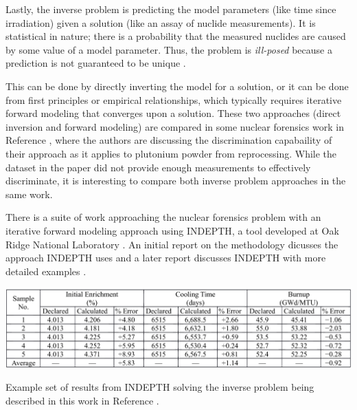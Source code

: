 Lastly, the inverse problem is predicting the model parameters (like time since
irradiation) given a solution (like an assay of nuclide measurements).  It is
statistical in nature; there is a probability that the measured nuclides are
caused by some value of a model parameter. Thus, the problem is
\textit{ill-posed} because a prediction is not guaranteed to be unique
\cite{skutnik_2016}. 

This can be done by directly inverting the model for a solution, or it can be
done from first principles or empirical relationships, which typically requires
iterative forward modeling that converges upon a solution. These two approaches
(direct inversion and forward modeling) are compared in some nuclear forensics
work in Reference \cite{inverse_compare}, where the authors are discussing the
discrimination capabaility of their approach as it applies to plutonium powder
from reprocessing. While the dataset in the paper did not provide enough
measurements to effectively discriminate, it is interesting to compare both
inverse problem approaches in the same work.   

There is a suite of work approaching the nuclear forensics problem with an
iterative forward modeling approach using \gls{INDEPTH}, a tool developed at
Oak Ridge National Laboratory \cite{grogan_sensitivity1, grogan_sensitivity2,
grogan_indepth_2018, weber_2006, weber_2010, weber_2011}.  An initial report on
the methodology dicusses the approach \gls{INDEPTH} uses \cite{weber_2006} and
a later report discusses \gls{INDEPTH} with more detailed examples
\cite{grogan_indepth_2018}.  

\begin{table}[!htb]
  \centering
  \includegraphics[width=\linewidth]{./chapters/litrev/indepth.png}
  \caption[Example of results from \acrshort{INDEPTH}]
          {Example set of results from \acrshort{INDEPTH} solving the inverse 
           problem being described in this work in Reference 
           \cite{grogan_indepth_2018}.}
  \label{tbl:indepth}
\end{table}

